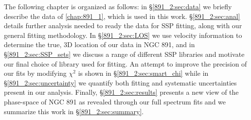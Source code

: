 
The following chapter is organized as follows: in
\S\ref{891_2:sec:data} we briefly describe the data of
\ref{chap:891_1}, which is used in this work. \S\ref{891_2:sec:anal}
details further analysis needed to ready the data for SSP fitting,
along with our general fitting methodology. In \S\ref{891_2:sec:LOS}
we use velocity information to determine the true, 3D location of our
data in NGC 891, and in \S\ref{891_2:sec:SSP_sets} we discuss a range
of different SSP libraries and motivate our final choice of library
used for fitting. An attempt to improve the precision of our fits by
modifying $\chi^2$ is shown in \S\ref{891_2:sec:smart_chi} while in
\S\ref{891_2:sec:uncertainty} we quantify both fitting and systematic
uncertainties present in our analysis. Finally,
\S\ref{891_2:sec:results} presents a new view of the phase-space of
NGC 891 as revealed through our full spectrum fits and we summarize
this work in \S\ref{891_2:sec:summary}.
